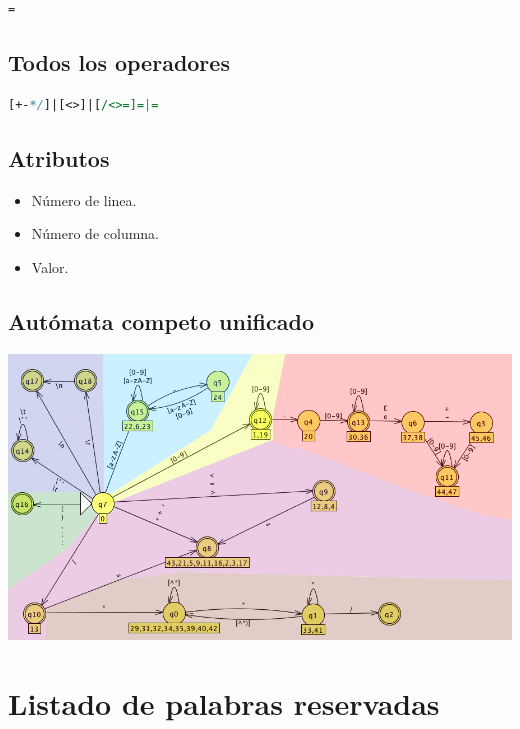             \begin{lstlisting}[language=Perl]
=
            \end{lstlisting}

        \subsection{Todos los operadores}

            \begin{lstlisting}[language=Perl]
[+-*/]|[<>]|[/<>=]=|=
            \end{lstlisting}

        \subsection{Atributos}

            \begin{itemize}
                \item Número de linea.
                \item Número de columna.
                \item Valor.
            \end{itemize}

    \subsection{Autómata competo unificado}

         \hspace{-4.8em}\includegraphics[scale=.61]{../Design/jflap/automata.png}

            \hfill
            \clearpage


 
\section{Listado de palabras reservadas}
    
